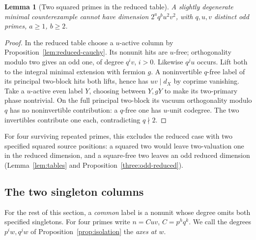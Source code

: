 \documentclass[11pt,a4paper]{article}
\numberwithin{equation}{section}
\newtheorem{lemma}[theorem]{Lemma}
\theoremstyle{remark}
\begin{document}
\begin{lemma}[Two squared primes in the reduced table]\label{fam:M:8.4}\label{seq:two-odd-squares}\label{lem:fermion-pair}
A slightly degenerate minimal counterexample cannot have dimension
$2^a q^b u^2v^2$, with $q,u,v$ distinct odd primes, $a\ge1$, $b\ge2$.
\end{lemma}
\begin{proof}
In the reduced table choose a $u$-active column by
Proposition~\ref{lem:reduced-cauchy}. Its nonunit hits are $u$-free;
orthogonality modulo two gives an odd one, of degree $q^iv$, $i>0$.
Likewise $q^ju$ occurs. Lift both to the integral minimal extension
with fermion $g$. A noninvertible $q$-free label of its principal
two-block hits both lifts, hence has $uv\mid d_X$ by coprime vanishing.
Take a $u$-active even label $Y$, choosing between $Y,gY$ to make
its two-primary phase nontrivial. On the full principal two-block
its vacuum orthogonality modulo $q$ has no noninvertible contribution:
a $q$-free one has $u$-unit codegree. The two invertibles contribute
one each, contradicting $q\nmid2$.
\end{proof}
For four surviving repeated primes, this excludes the reduced case
with two specified squared source positions: a squared two would leave two-valuation one in the reduced
dimension, and a square-free two leaves an odd reduced dimension
(Lemma~\ref{lem:tables} and Proposition~\ref{three:odd-reduced}).

\subsection{The two singleton columns}\label{fam:M:sec:8.1}
For the rest of this section, a \emph{common} label is a nonunit
whose degree omits both specified singletons. For four primes write
$n=Cuv$, $C=p^h q^k$. We call the degrees $p^iw,q^jw$ of
Proposition~\ref{prop:isolation} the \emph{axes at $w$}.
\end{document}
